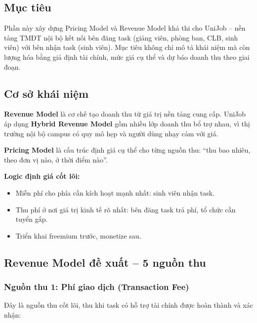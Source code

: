 
\subsection{Mục tiêu}

Phần này xây dựng Pricing Model và Revenue Model khả thi cho UniJob -- nền tảng TMĐT nội bộ
kết nối bên đăng task (giảng viên, phòng ban, CLB, sinh viên) với bên nhận task (sinh viên).
Mục tiêu không chỉ mô tả khái niệm mà còn lượng hóa bằng giả định tài chính, mức giá cụ
thể và dự báo doanh thu theo giai đoạn.

\subsection{Cơ sở khái niệm}

\textbf{Revenue Model} là cơ chế tạo doanh thu từ giá trị nền tảng cung cấp. UniJob áp dụng
\textbf{Hybrid Revenue Model} gồm nhiều lớp doanh thu bổ trợ nhau, vì thị trường nội bộ
campus có quy mô hẹp và người dùng nhạy cảm với giá.

\textbf{Pricing Model} là cấu trúc định giá cụ thể cho từng nguồn thu:
``thu bao nhiêu, theo đơn vị nào, ở thời điểm nào''.

\textbf{Logic định giá cốt lõi:}
\begin{itemize}
  \item Miễn phí cho phía cần kích hoạt mạnh nhất: sinh viên nhận task.
  \item Thu phí ở nơi giá trị kinh tế rõ nhất: bên đăng task trả phí, tổ chức cần tuyển gấp.
  \item Triển khai freemium trước, monetize sau.
\end{itemize}

\subsection{Revenue Model đề xuất -- 5 nguồn thu}

\subsubsection{Nguồn thu 1: Phí giao dịch (Transaction Fee)}

Đây là nguồn thu cốt lõi, thu khi task có hỗ trợ tài chính được hoàn thành và xác nhận:

